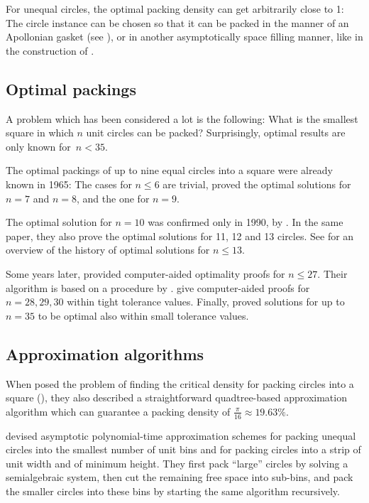 \documentclass[a4paper,style=print,bibliography=totoc,nexus,lnum,extramargin]{tubsbook}
\begin{document}
For unequal circles, the optimal packing density can get arbitrarily close to 1: The circle instance can be chosen so that it can be packed in the manner of an Apollonian gasket (see ), or in another asymptotically space filling manner, like in the construction of \textcite{bourke2011random}.


\subsection{Optimal packings}

A problem which has been considered a lot is the following: What is the smallest square in which $n$ unit circles can be packed?
Surprisingly, optimal results are only known for~$n < 35$.

The optimal packings of up to nine equal circles into a square were already known in 1965: The cases for $n \le 6$ are trivial,
\textcite{schaer1965densest} proved the optimal solutions for $n = 7$ and $n = 8$, and \textcite{SM1965geometric} the one for $n = 9$.

The optimal solution for $n = 10$ was confirmed only in 1990, by \textcite{DPW1990optimal}. In the same paper, they also prove the optimal solutions for 11, 12 and 13 circles.
See \textcite{WMP1994history} for an overview of the history of optimal solutions for $n \le 13$.

Some years later, \textcite{NO1998more} provided computer-aided optimality proofs for $n \le 27$. Their algorithm is based on a procedure by \textcite{PWMD1992packing}.
\textcite{MC2005new} give computer-aided proofs for $n=28,29,30$ within tight tolerance values.
Finally, \textcite{LR2002packing} proved solutions for up to $n=35$ to be optimal also within small tolerance values.

\subsection{Approximation algorithms}

When \textcite{DFL2010circle} posed the problem of finding the critical density for packing circles into a square (), they also described a straightforward quadtree-based approximation algorithm which can guarantee a packing density of $\frac{\pi}{16} \approx 19.63\%$.

\textcite{MPSSW2014polynomial} devised asymptotic polynomial-time approximation schemes for packing unequal circles into the smallest number of unit bins and for packing circles into a strip of unit width and of minimum height. They first pack “large” circles by solving a semialgebraic system, then cut the remaining free space into sub-bins, and pack the smaller circles into these bins by starting the same algorithm recursively.
\end{document}

